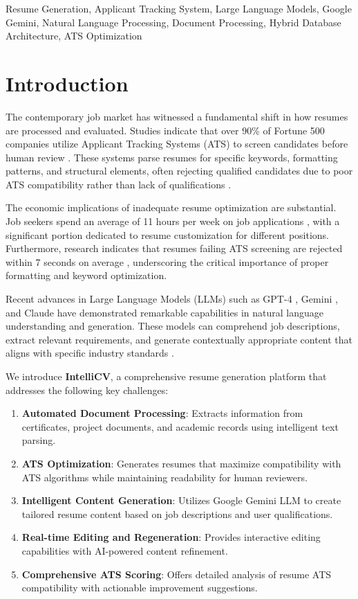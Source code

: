 \documentclass[conference]{IEEEtran}
\begin{document}
\begin{IEEEkeywords}
Resume Generation, Applicant Tracking System, Large Language Models, Google Gemini, Natural Language Processing, Document Processing, Hybrid Database Architecture, ATS Optimization
\end{IEEEkeywords}

\section{Introduction}

The contemporary job market has witnessed a fundamental shift in how resumes are processed and evaluated. Studies indicate that over 90\% of Fortune 500 companies utilize Applicant Tracking Systems (ATS) to screen candidates before human review \cite{smith2023ats}. These systems parse resumes for specific keywords, formatting patterns, and structural elements, often rejecting qualified candidates due to poor ATS compatibility rather than lack of qualifications \cite{johnson2022recruitment}.

The economic implications of inadequate resume optimization are substantial. Job seekers spend an average of 11 hours per week on job applications \cite{linkedin2023report}, with a significant portion dedicated to resume customization for different positions. Furthermore, research indicates that resumes failing ATS screening are rejected within 7 seconds on average \cite{ladders2018study}, underscoring the critical importance of proper formatting and keyword optimization.

Recent advances in Large Language Models (LLMs) such as GPT-4 \cite{achiam2023gpt}, Gemini \cite{team2023gemini}, and Claude \cite{anthropic2024claude} have demonstrated remarkable capabilities in natural language understanding and generation. These models can comprehend job descriptions, extract relevant requirements, and generate contextually appropriate content that aligns with specific industry standards \cite{chen2024llm}.

We introduce \textbf{IntelliCV}, a comprehensive resume generation platform that addresses the following key challenges:

\begin{enumerate}
    \item \textbf{Automated Document Processing}: Extracts information from certificates, project documents, and academic records using intelligent text parsing.
    \item \textbf{ATS Optimization}: Generates resumes that maximize compatibility with ATS algorithms while maintaining readability for human reviewers.
    \item \textbf{Intelligent Content Generation}: Utilizes Google Gemini LLM to create tailored resume content based on job descriptions and user qualifications.
    \item \textbf{Real-time Editing and Regeneration}: Provides interactive editing capabilities with AI-powered content refinement.
    \item \textbf{Comprehensive ATS Scoring}: Offers detailed analysis of resume ATS compatibility with actionable improvement suggestions.
\end{enumerate}
\end{document}

